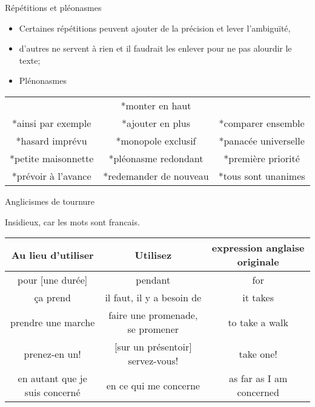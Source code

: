 \documentclass[french]{beamer}
\begin{document}
\begin{frame}{Répétitions et pléonasmes}

\begin{itemize}
	\item Certaines répétitions peuvent ajouter de la précision et lever l'ambiguïté, 
	\item d'autres ne servent à rien et il faudrait les enlever pour ne pas alourdir le texte;
	\item Plénonasmes
\end{itemize}

\begin{center}\scriptsize
	\begin{tabular}{ccc}
		~ & *monter en haut & ~ \\
		*ainsi par exemple & 
		*ajouter en plus & 
		*comparer ensemble \\
		*hasard imprévu & 
		*monopole exclusif & 
		*panacée universelle \\
		*petite maisonnette & 
		*pléonasme redondant & 
		*première priorité \\
		*prévoir à l'avance & 
		*redemander de nouveau & 
		*tous sont unanimes \\
	\end{tabular} 
\end{center}

\end{frame}

\begin{frame}{Anglicismes de tournure}

Insidieux, car les mots sont francais.

\begin{center}\tiny
	\begin{tabular}{ccc}
		\hline
		Au lieu d'utiliser & Utilisez & expression anglaise originale \\
		\hline
		pour [une durée] & pendant & for \\
		ça prend & il faut, il y a besoin de & it takes \\
		prendre une marche & faire une promenade, se promener & to take a walk \\
		prenez-en un! & [sur un présentoir] servez-vous! & take one! \\
		en autant que je suis concerné & en ce qui me concerne& as far as I am concerned \\
		\hline
	\end{tabular}
\end{center}
\end{frame}
\end{document}
